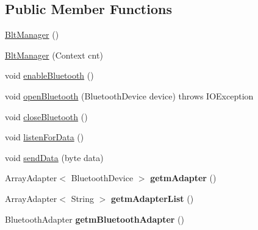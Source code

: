 \subsection*{Public Member Functions}
\begin{DoxyCompactItemize}
\item 
\hyperlink{classcom_1_1hobby_1_1smart_1_1bluetoothcomm_1_1_blt_manager_ab9428cea39cb30995d320fe4ef6efcde}{Blt\+Manager} ()
\item 
\hyperlink{classcom_1_1hobby_1_1smart_1_1bluetoothcomm_1_1_blt_manager_a960eaa2dad2facecfab12da5408a63e9}{Blt\+Manager} (Context cnt)
\item 
void \hyperlink{classcom_1_1hobby_1_1smart_1_1bluetoothcomm_1_1_blt_manager_ad44dd68329e449633f69f8d3904f35d7}{enable\+Bluetooth} ()
\item 
void \hyperlink{classcom_1_1hobby_1_1smart_1_1bluetoothcomm_1_1_blt_manager_ae6274af1cc3ee13291cc8ef6f365a92f}{open\+Bluetooth} (Bluetooth\+Device device)  throws I\+O\+Exception
\item 
void \hyperlink{classcom_1_1hobby_1_1smart_1_1bluetoothcomm_1_1_blt_manager_a0118f6e69c6ee2a9059eb71a178c4b7f}{close\+Bluetooth} ()
\item 
void \hyperlink{classcom_1_1hobby_1_1smart_1_1bluetoothcomm_1_1_blt_manager_ab2ec59deffb80584481167ce99ff6b40}{listen\+For\+Data} ()
\item 
void \hyperlink{classcom_1_1hobby_1_1smart_1_1bluetoothcomm_1_1_blt_manager_a9d223f09362d0281ed7960ca18d089eb}{send\+Data} (byte data)
\item 
\mbox{\label{classcom_1_1hobby_1_1smart_1_1bluetoothcomm_1_1_blt_manager_a16e39e29a1ff4b8bfecc91adb0dba013}} 
Array\+Adapter$<$ Bluetooth\+Device $>$ {\bfseries getm\+Adapter} ()
\item 
\mbox{\label{classcom_1_1hobby_1_1smart_1_1bluetoothcomm_1_1_blt_manager_ae52e86a73e1d77a0ccdb0c0b09de5781}} 
Array\+Adapter$<$ String $>$ {\bfseries getm\+Adapter\+List} ()
\item 
\mbox{\label{classcom_1_1hobby_1_1smart_1_1bluetoothcomm_1_1_blt_manager_ac33cf5fbe2fac2c16b3c80e729d5c8e0}} 
Bluetooth\+Adapter {\bfseries getm\+Bluetooth\+Adapter} ()
\end{DoxyCompactItemize}
